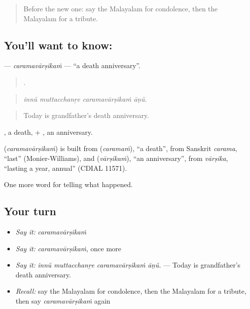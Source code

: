 \label{lesson:ML-C392-caramavarsikam}



\begin{quote}
Before the new one: say the Malayalam for condolence, then the Malayalam for a tribute.
\end{quote}

\subsection*{You'll want to know: }
\textbf{} — \emph{caramavārṣikaṁ} — \textquotedblleft{}a death anniversary\textquotedblright{}.

\begin{quote}
   .
\end{quote}

\begin{quote}
\emph{innŭ muttacchanṟe caramavārṣikaṁ āṇŭ.}
\end{quote}

\begin{quote}
Today is grandfather's death anniversary.
\end{quote}

, a death, + , an anniversary.

\begin{cousinweb}
\textbf{} (\emph{caramavārṣikaṁ}) is built from  (\emph{caramaṁ}), \textquotedblleft{}a death\textquotedblright{}, from Sanskrit \emph{carama}, \textquotedblleft{}last\textquotedblright{} (Monier-Williams), and  (\emph{vārṣikaṁ}), \textquotedblleft{}an anniversary\textquotedblright{}, from \emph{vārṣika}, \textquotedblleft{}lasting a year, annual\textquotedblright{} (CDIAL 11571).
\end{cousinweb}

\begin{grammarlens}[title={What you've built}]
One more word for telling what happened.
\end{grammarlens}

\subsection*{Your turn}
\begin{itemize}
\raggedright
  \item \emph{Say it:} \emph{caramavārṣikaṁ}
  \item \emph{Say it:} \emph{caramavārṣikaṁ}, once more
  \item \emph{Say it:} \emph{innŭ muttacchanṟe caramavārṣikaṁ āṇŭ.} — Today is grandfather's death anniversary.
  \item \emph{Recall:} say the Malayalam for condolence, then the Malayalam for a tribute, then say \emph{caramavārṣikaṁ} again
\end{itemize}

